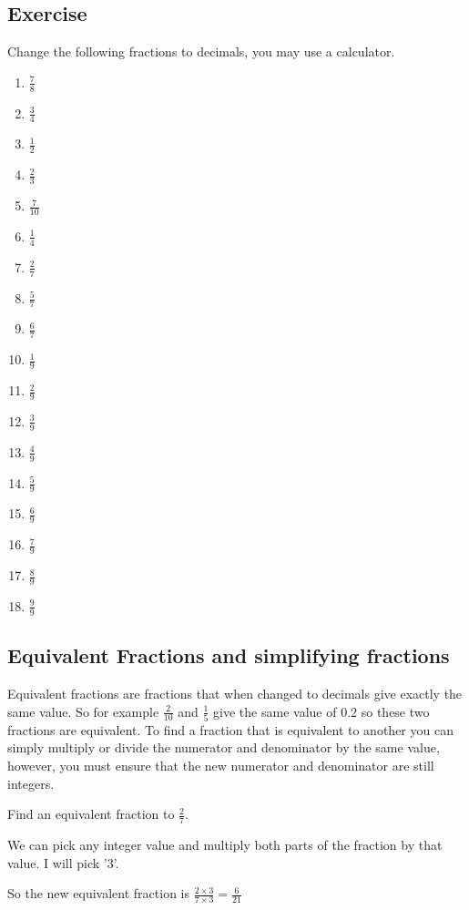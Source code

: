 \subsection{Exercise}
Change the following fractions to decimals, you may use a calculator.
\begin{multicols}{3}
\begin{enumerate}
	\item $\frac{7}{8}$
	\item $\frac{3}{4}$
	\item $\frac{1}{2}$
	\item $\frac{2}{3}$
	\item $\frac{7}{10}$
	\item $\frac{1}{4}$
	\item $\frac{2}{7}$
	\item $\frac{5}{7}$
	\item $\frac{6}{7}$
	\item $\frac{1}{9}$
	\item $\frac{2}{9}$
	\item $\frac{3}{9}$
	\item $\frac{4}{9}$
	\item $\frac{5}{9}$
	\item $\frac{6}{9}$
	\item $\frac{7}{9}$
	\item $\frac{8}{9}$
	\item $\frac{9}{9}$
\end{enumerate}
\end{multicols}
\subsection{Equivalent Fractions and simplifying fractions}
Equivalent fractions are fractions that when changed to decimals give exactly the same value.  So for example $\frac{2}{10}$ and $\frac{1}{5}$ give the same value of $0.2$ so these two fractions are equivalent.  To find a fraction that is equivalent to another you can simply multiply or divide the numerator and denominator by the same value, however, you must ensure that the new numerator and denominator are still integers.

\begin{exmp}
Find an equivalent fraction to $\frac{2}{7}$.

We can pick any integer value and multiply both parts of the fraction by that value.  I will pick '3'.

So the new equivalent fraction is $\frac{2 \times 3}{7 \times 3} = \frac{6}{21}$
\end{exmp}

